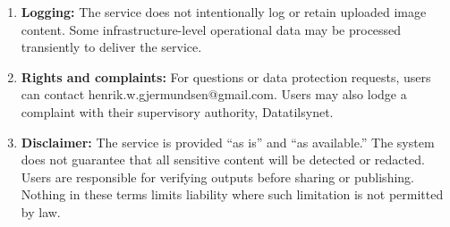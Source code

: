 \begin{enumerate}
    \item \textbf{Logging:} The service does not intentionally log or retain uploaded image content. Some infrastructure-level operational data may be processed transiently to deliver the service.

    \item \textbf{Rights and complaints:} For questions or data protection requests, users can contact henrik.w.gjermundsen@gmail.com. Users may also lodge a complaint with their supervisory authority, Datatilsynet.

    \item \textbf{Disclaimer:} The service is provided ``as is'' and ``as available.'' The system does not guarantee that all sensitive content will be detected or redacted. Users are responsible for verifying outputs before sharing or publishing. Nothing in these terms limits liability where such limitation is not permitted by law.
\end{enumerate}


